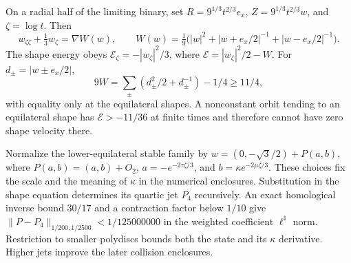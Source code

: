 On a radial half of the limiting binary, set
$R=9^{1/3}t^{2/3}e_x$, $Z=9^{1/3}t^{2/3}w$, and $\zeta=\log t$.
Then
\[
 w_{\zeta\zeta}+\tfrac13w_\zeta=\nabla W(w),\qquad
 W(w)=\tfrac19\bigl(|w|^2+|w+e_x/2|^{-1}+|w-e_x/2|^{-1}\bigr).
\]
The shape energy obeys
$\mathcal E_\zeta=-|w_\zeta|^2/3$, where
$\mathcal E=|w_\zeta|^2/2-W$. For $d_\pm=|w\pm e_x/2|$,
\[
 9W=\sum_\pm(d_\pm^2/2+d_\pm^{-1})-1/4\ge11/4,
\]
with equality only at the equilateral shapes. A nonconstant orbit tending
to an equilateral shape has $\mathcal E>-11/36$ at finite times and
therefore cannot have zero shape velocity there.

Normalize the lower-equilateral stable family by
$w=(0,-\sqrt3/2)+P(a,b)$, where $P(a,b)=(a,b)+O_2$,
$a=-e^{-2\tau\zeta/3}$, and $b=\kappa e^{-2\mu\zeta/3}$.
These choices fix the scale and the meaning of $\kappa$ in the numerical
enclosures. Substitution in the shape equation determines its quartic
jet $P_4$ recursively. An exact homological inverse bound $30/17$ and a
contraction factor below $1/10$ give
$\|P-P_4\|_{1/200,1/2500}<1/125000000$ in the weighted coefficient
$\ell^1$ norm. Restriction to smaller polydiscs bounds both the state and
its $\kappa$ derivative. Higher jets improve the later collision enclosures.

